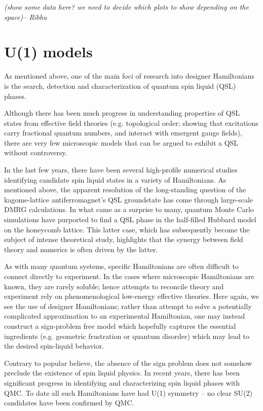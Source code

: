 \documentclass[aps,prb,groupedaddress,twocolumn]{revtex4}
\begin{document}
{\em (show some data here? we need to decide which plots to show
  depending on the space)-- Ribhu}
\section{U(1) models}

As mentioned above, one of the main foci of research into designer Hamiltonians is the search, detection and characterization of quantum spin liquid (QSL) phases.  

Although there has been much progress in understanding properties of QSL states from effective field theories (e.g. topological order; showing that excitations carry fractional quantum numbers, and interact with emergent gauge fields), there are very few microscopic models that can be argued to exhibit a QSL  without controversy.

In the last few years, there have been several high-profile numerical studies identifying candidate spin liquid states in a variety of Hamiltonians.  As mentioned above, the apparent resolution of the long-standing question of the kagome-lattice antiferromagnet's QSL groundstate has come through large-scale DMRG calculations.  In what came as a surprise to many, quantum Monte Carlo simulations have purported to find a QSL phase in the half-filled Hubbard model on the honeycomb lattice.  This latter case, which has subsequently become the subject of intense theoretical study, highlights that the synergy between field theory and numerics is often driven by the latter.

As with many quantum systems, specific Hamiltonians are often difficult to connect directly to experiment.  In the cases where microscopic Hamiltonians are known, they are rarely soluble; hence attempts to reconcile theory and experiment rely on phenomenological low-energy effective theories.  Here again, we see the use of designer Hamiltonians; rather than attempt to solve a potentially complicated approximation to an experimental Hamiltonian, one may instead construct a sign-problem free model which hopefully captures the essential ingredients (e.g. geometric frustration or quantum disorder) which may lead to the desired spin-liquid behavior.

Contrary to popular believe, the absence of the sign problem does not somehow preclude the existence of spin liquid physics.  In recent years, there has been significant progress in identifying and characterizing spin liquid phases with QMC.  To date all such Hamiltonians have had U(1) symmetry -- no clear SU(2) candidates have been confirmed by QMC.  
\end{document}
